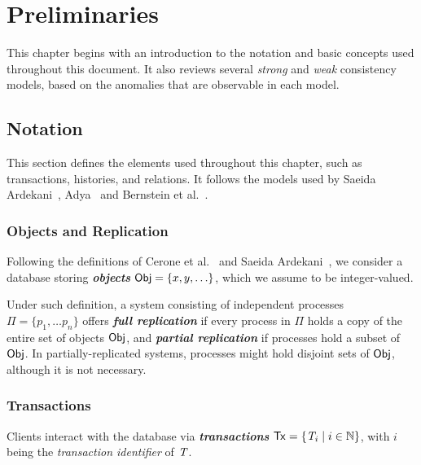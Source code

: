 \cleardoublepage
\chapter{Preliminaries}
\label{chapter:preliminaries}

This chapter begins with an introduction to the notation and basic concepts used throughout this document. It also reviews several \emph{strong} and \emph{weak} consistency models, based on the anomalies that are observable in each model.

\section{Notation}
\label{sect:notation}

This section defines the elements used throughout this chapter, such as transactions, histories, and relations. It follows the models used by Saeida Ardekani~\citep{ardekani_thesis}, Adya~\citep{adya_thesis} and Bernstein et al.~\citep{bernstein_concurrency}.

\subsection{Objects and Replication}
\label{sect:objects}

Following the definitions of Cerone et al.~\citep{concur_framework} and Saeida Ardekani~\citep{ardekani_thesis}, we consider a database storing \textbf{\em objects} ${\sf Obj} = \{x, y, \ldots\}$, which we assume to be integer-valued.

Under such definition, a system consisting of independent processes $\Pi = \{p_1, \ldots p_n\}$ offers \textbf{\em full replication} if every process in $\Pi$ holds a copy of the entire set of objects ${\sf Obj}$, and \textbf{\em partial replication} if processes hold a subset of ${\sf Obj}$. In partially-replicated systems, processes might hold disjoint sets of ${\sf Obj}$, although it is not necessary.

\subsection{Transactions}
\label{sect:transactions}

Clients interact with the database via \textbf{\em transactions} ${\sf Tx} = \{\mathit{T}_i \mid i \in \mathbb{N}\}$, with $i$ being the \emph{transaction identifier} of $\mathit{T}$.

